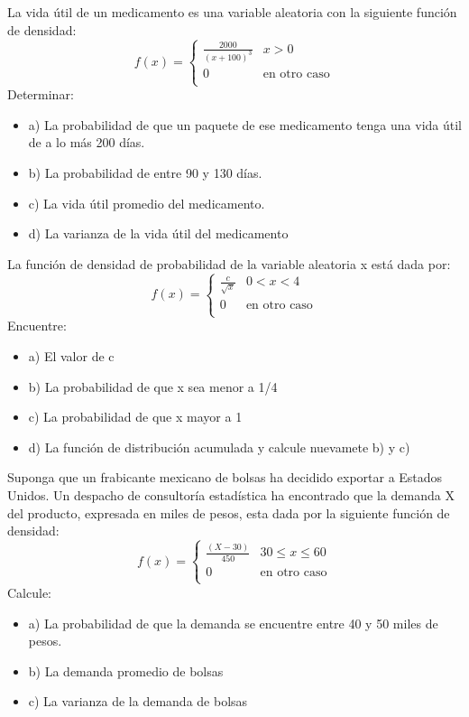 \documentclass{oxmathproblems}
\begin{document}
\begin{questions}

\miquestion La vida útil de un medicamento es una variable aleatoria con la siguiente función de densidad: 
\[   
f(x) = 
     \begin{cases}
       \frac{2000}{(x+100)^3} & x > 0 \\
       0 & \text{en otro caso} \\
     \end{cases}
\]
$$$$
Determinar: 
\begin{itemize}
\item  a) La probabilidad de que un paquete de ese medicamento tenga una vida útil de a lo más 200 días. 
\item  b) La probabilidad de entre 90 y 130 días.
\item  c) La vida útil promedio del medicamento. 
\item  d) La varianza de la vida útil del medicamento
\end{itemize}

\miquestion La función de densidad de probabilidad de la variable aleatoria x está dada por: 
\[ 
f(x) = 
     \begin{cases}
       \frac{c}{\sqrt{x}} & 0 <x < 4 \\
       0 & \text{en otro caso} \\
     \end{cases}
\]
$$$$
Encuentre:  
\begin{itemize}
\item  a) El valor de c
\item  b) La probabilidad de que x sea menor a 1/4
\item  c) La probabilidad de que x mayor a 1
\item  d) La función de distribución acumulada y calcule nuevamete b) y c)
\end{itemize}

\miquestion Suponga que un frabicante mexicano de bolsas ha decidido exportar a Estados Unidos. Un despacho de consultoría estadística ha encontrado que la demanda X del producto, expresada en miles de pesos, esta dada por la siguiente función de densidad: 
\[ 
f(x) = 
     \begin{cases}
       \frac{(X-30)}{450}  & 30  \leq x  \leq 60 \\
       0 & \text{en otro caso} \\
     \end{cases}
\]
$$$$
Calcule: 
\begin{itemize}
\item  a) La probabilidad de que la demanda se encuentre entre 40 y 50 miles de pesos. 
\item  b) La demanda promedio de bolsas 
\item  c) La varianza de la demanda de bolsas
\end{itemize}


\end{questions}
\end{document}

